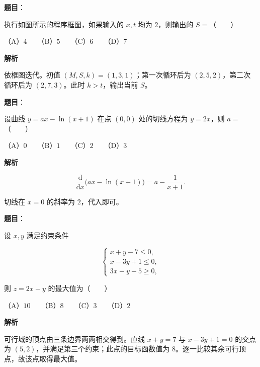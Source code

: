 \begin{answer}

\textbf{题目}：

执行如图所示的程序框图，如果输入的 $x,t$ 均为 $2$，则输出的 $S=$\mbox{（　　）}
\nopagebreak[4]
\begin{center}\end{center}
\nopagebreak[4]
（A）$4$　　（B）$5$　　（C）$6$　　（D）$7$

\textbf{解析}

依框图迭代。初值 $(M,S,k)=(1,3,1)$；第一次循环后为 $(2,5,2)$，第二次循环后为 $(2,7,3)$。此时 $k>t$，输出当前 $S$。


\end{answer}
\begin{answer}

\textbf{题目}：

设曲线 $y=ax-\ln(x+1)$ 在点 $(0,0)$ 处的切线方程为 $y=2x$，则 $a=$\mbox{（　　）}

（A）$0$　　（B）$1$　　（C）$2$　　（D）$3$

\textbf{解析}

\nopagebreak[4]
\[
\frac{\mathrm d}{\mathrm dx}\bigl(ax-\ln(x+1)\bigr)=a-\frac1{x+1}.
\]

切线在 $x=0$ 的斜率为 $2$，代入即可。


\end{answer}
\begin{answer}

\textbf{题目}：

设 $x,y$ 满足约束条件

\nopagebreak[4]
\[
\begin{cases}
x+y-7\leqslant0,\\
x-3y+1\leqslant0,\\
3x-y-5\geqslant0,
\end{cases}
\]

则 $z=2x-y$ 的最大值为\mbox{（　　）}

（A）$10$　　（B）$8$　　（C）$3$　　（D）$2$

\textbf{解析}

可行域的顶点由三条边界两两相交得到。直线 $x+y=7$ 与 $x-3y+1=0$ 的交点为 $(5,2)$，并满足第三个约束；此点的目标函数值为 $8$。逐一比较其余可行顶点，故该点取得最大值。


\end{answer}
